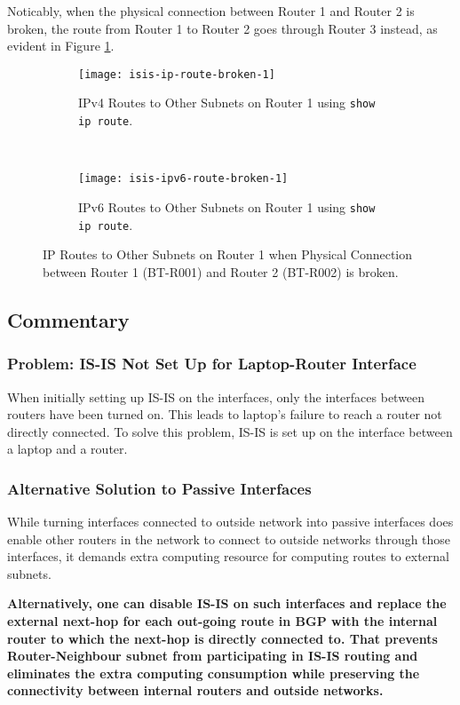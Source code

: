 Noticably, when the physical connection between Router 1 and Router 2 is broken, the route from Router 1 to Router 2 goes through Router 3 instead, as evident in Figure \ref{fig:isis-ip-route-broken}.

\begin{figure}[ht!]
    \centering    
    \begin{subfigure}[b]{\textwidth}
        \centering
        \texttt{[image: isis-ip-route-broken-1]}
        \caption{IPv4 Routes to Other Subnets on Router 1 using \texttt{show ip route}.}
    \end{subfigure}
    ~
    \begin{subfigure}[b]{\textwidth}
        \centering
        \texttt{[image: isis-ipv6-route-broken-1]}
        \caption{IPv6 Routes to Other Subnets on Router 1 using \texttt{show ip route}.}
    \end{subfigure}
    \caption{IP Routes to Other Subnets on Router 1 when Physical Connection between Router 1 (BT-R001) and Router 2 (BT-R002) is broken.}
    \label{fig:isis-ip-route-broken}
\end{figure}

\subsection{Commentary}

\subsubsection{Problem: IS-IS Not Set Up for Laptop-Router Interface}
When initially setting up IS-IS on the interfaces, only the interfaces between routers have been turned on. This leads to laptop's failure to reach a router not directly connected.
To solve this problem, IS-IS is set up on the interface between a laptop and a router.

\subsubsection{Alternative Solution to Passive Interfaces}
While turning interfaces connected to outside network into passive interfaces does enable other routers in the network to connect to outside networks through those interfaces, it demands extra computing resource for computing routes to external subnets. 

\textbf{Alternatively, one can disable IS-IS on such interfaces and replace the external next-hop for each out-going route in BGP with the internal router to which the next-hop is directly connected to. That prevents Router-Neighbour subnet from participating in IS-IS routing and eliminates the extra computing consumption while preserving the connectivity between internal routers and outside networks.}


\clearpage



